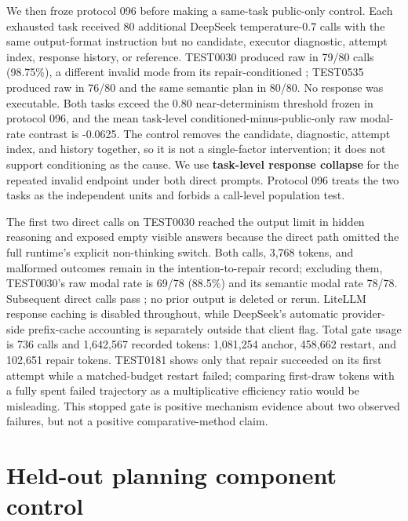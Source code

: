 We then froze protocol 096 before making a same-task public-only control. Each exhausted task received 80 additional DeepSeek temperature-0.7 calls with the same output-format instruction but no candidate, executor diagnostic, attempt index, response history, or reference. TEST0030 produced raw \texttt{\detokenize{["bookshelf"]}} in 79/80 calls (98.75\%), a different invalid mode from its repair-conditioned \texttt{\detokenize{["IMPOSSIBLE"]}}; TEST0535 produced raw \texttt{} in 76/80 and the same semantic plan in 80/80. No response was executable. Both tasks exceed the 0.80 near-determinism threshold frozen in protocol 096, and the mean task-level conditioned-minus-public-only raw modal-rate contrast is -0.0625. The control removes the candidate, diagnostic, attempt index, and history together, so it is not a single-factor intervention; it does not support conditioning as the cause. We use \textbf{task-level response collapse} for the repeated invalid endpoint under both direct prompts. Protocol 096 treats the two tasks as the independent units and forbids a call-level population test.

The first two direct calls on TEST0030 reached the output limit in hidden reasoning and exposed empty visible answers because the direct path omitted the full runtime's explicit non-thinking switch. Both calls, 3,768 tokens, and malformed outcomes remain in the intention-to-repair record; excluding them, TEST0030's raw modal rate is 69/78 (88.5\%) and its semantic modal rate 78/78. Subsequent direct calls pass \texttt{}; no prior output is deleted or rerun. LiteLLM response caching is disabled throughout, while DeepSeek's automatic provider-side prefix-cache accounting is separately outside that client flag. Total gate usage is 736 calls and 1,642,567 recorded tokens: 1,081,254 anchor, 458,662 restart, and 102,651 repair tokens. TEST0181 shows only that repair succeeded on its first attempt while a matched-budget restart failed; comparing first-draw tokens with a fully spent failed trajectory as a multiplicative efficiency ratio would be misleading. This stopped gate is positive mechanism evidence about two observed failures, but not a positive comparative-method claim.

\section{Held-out planning component control}
\label{app:planner}

